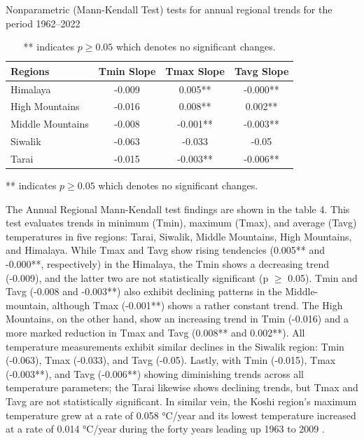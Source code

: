 \begin{table}[H]
  \centering
  \caption{Nonparametric (Mann-Kendall Test) tests for annual regional trends for the period 1962–2022}
  \begin{tabular}{@{}lccc@{}}
      \toprule
      \textbf{Regions} & \textbf{Tmin Slope} & \textbf{Tmax Slope} & \textbf{Tavg Slope} \\ 
      \midrule
      Himalaya        & -0.009       & 0.005**      & -0.000** \\ 
      High Mountains  & -0.016       & 0.008**      & 0.002**  \\ 
      Middle Mountains & -0.008      & -0.001**     & -0.003** \\ 
      Siwalik         & -0.063       & -0.033       & -0.05    \\ 
      Tarai           & -0.015       & -0.003**     & -0.006** \\ 
      \bottomrule
  \end{tabular}
  \label{tab:mann_kendall}
  \begin{flushleft}
    \footnotesize{** indicates $p \geq 0.05$ which denotes no significant changes.}
\end{flushleft}
  \caption*{** indicates $p \geq 0.05$ which denotes no significant changes.}
\end{table}

The Annual Regional Mann-Kendall test findings are shown in the table 4. This test evaluates trends in minimum (Tmin), maximum (Tmax), and average (Tavg) temperatures in five regions: Tarai, Siwalik, Middle Mountains, High Mountains, and Himalaya. While Tmax and Tavg show rising tendencies (0.005** and -0.000**, respectively) in the Himalaya, the Tmin shows a decreasing trend (-0.009), and the latter two are not statistically significant (p $\geq$ 0.05). Tmin and Tavg (-0.008 and -0.003**) also exhibit declining patterns in the Middle-mountain, although Tmax (-0.001**) shows a rather constant trend. The High Mountains, on the other hand, show an increasing trend in Tmin (-0.016) and a more marked reduction in Tmax and Tavg (0.008** and 0.002**). All temperature measurements exhibit similar declines in the Siwalik region: Tmin (-0.063), Tmax (-0.033), and Tavg (-0.05). Lastly, with Tmin (-0.015), Tmax (-0.003**), and Tavg (-0.006**) showing diminishing trends across all temperature parameters; the Tarai likewise shows declining trends, but Tmax and Tavg are not statistically significant. In similar vein, the Koshi region's maximum temperature grew at a rate of 0.058 °C/year and its lowest temperature increased at a rate of 0.014 °C/year during the forty years leading up 1963 to 2009 \parencite{nepal_impacts_2016}.



